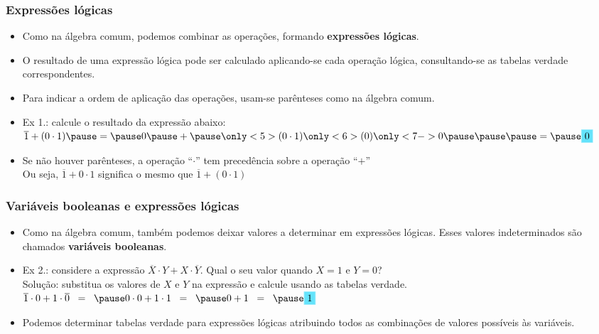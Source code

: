 \documentclass{beamer}
\begin{document}

\begin{frame}
 \frametitle{Expressões lógicas}

\begin{itemize}
 \item Como na álgebra comum, podemos combinar as operações, formando
\textbf{expressões lógicas}.
 \item O resultado de uma expressão lógica pode ser calculado aplicando-se cada
operação lógica, consultando-se as tabelas verdade correspondentes.
 \item Para indicar a ordem de aplicação das operações, usam-se parênteses como
na álgebra comum.
 \item Ex 1.: calcule o resultado da expressão abaixo:\\
$\overline{1} + (0 \cdot 1) \pause = \pause 0 \pause + \pause \only<5>{( 0 \cdot
1 )} \only<6>{( 0 )} \only<7->{0} \pause\pause\pause = \pause
\fcolorbox{skb}{skb}{0}$\\
\pause
 \item Se não houver parênteses, a operação ``$\cdot$'' tem precedência sobre a
operação ``$+$''\\
Ou seja, $\overline{1} + 0 \cdot 1$ significa o mesmo que $\overline{1} + (0
\cdot 1)$
\end{itemize}

\end{frame}



\begin{frame}
 \frametitle{Variáveis booleanas e expressões lógicas}

\begin{itemize}
 \item Como na álgebra comum, também podemos deixar valores a determinar em
expressões lógicas. Esses valores indeterminados são chamados
\textbf{variáveis booleanas}.
\pause
 \item Ex 2.: considere a expressão $\overline{X} \cdot Y + X \cdot
\overline{Y}$.
Qual o seu valor quando $X=1$ e $Y=0$?\\
\pause
Solução: substitua os valores de $X$ e $Y$ na expressão e calcule usando as
tabelas verdade.\\
\pause
$\overline{1} \cdot 0 + 1 \cdot \overline{0} \;\; = \;\; \pause 0 \cdot 0 + 1
\cdot 1 \;\; = \;\; \pause 0 + 1 \;\; = \;\; \pause \fcolorbox{skb}{skb}{1}$
\pause
\item Podemos determinar tabelas verdade para expressões lógicas atribuindo
todos as combinações de valores possíveis às variáveis.
\end{itemize}

\end{frame}
\end{document}
